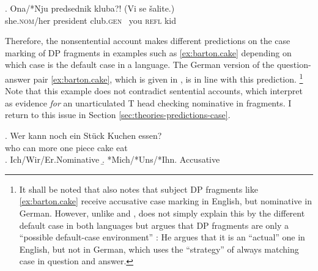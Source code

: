 \exg. Ona/*Nju predsednik kluba?! (Vi se šalite.)\\
she.\textsc{nom}/her president club.\textsc{gen} ~you \textsc{refl} kid\\ 
\hspace{-3em}

Therefore, the nonsentential account makes different predictions on the case marking of DP fragments in examples such as \ref{ex:barton.cake} depending on which case is the default case in a language. The German version of the question-answer pair \ref{ex:barton.cake}, which is given in \Next, is in line with this prediction.%
%
\footnote{It shall be noted that \citet[221]{schutze2001} also notes that subject DP fragments like \ref{ex:barton.cake} receive accusative case marking in English, but nominative in German. However, unlike \citet{barton.progovac2005} and \citet{progovac2006}, \citeauthor{schutze2001} does not simply explain this by the different default case in both languages but argues that DP fragments are only a ``possible default-case environment'' \citep[229]{schutze2001}: He argues that it is an ``actual'' one in English, but not in German, which uses the ``strategy'' of always matching case in question and answer.}\afterfn%
%
Note that this example does not contradict sentential accounts, which interpret \Next as evidence \textit{for} an unarticulated T head checking nominative in fragments. I return to this issue in Section \ref{sec:theories-predictions-case}.

\exg. Wer kann noch ein Stück Kuchen essen?\\
who can more one piece cake eat\\
\a. Ich/Wir/Er.\hfill Nominative
\b. *Mich/*Uns/*Ihn. \hfill Accusative

